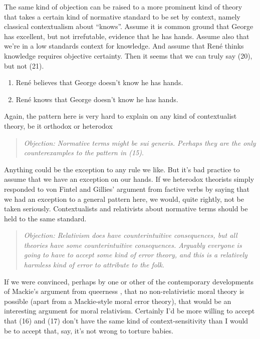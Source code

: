 The same kind of objection can be raised to a more prominent kind of theory that takes a certain kind of normative standard to be set by context, namely classical contextualism about ``knows''. Assume it is common ground that George has excellent, but not irrefutable, evidence that he has hands. Assume also that we're in a low standards context for knowledge. And assume that René thinks knowledge requires objective certainty. Then it seems that we can truly say (20), but not (21).

\begin{enumerate}
\renewcommand{\labelenumi}{(\arabic{enumi})}
\setcounter{enumi}{19}
\item René believes that George doesn't know he has hands.
\item René knows that George doesn't know he has hands.
\end{enumerate}

\noindent Again, the pattern here is very hard to explain on any kind of contextualist theory, be it orthodox or heterodox

\begin{quote}
\textit{Objection: Normative terms might be sui generis. Perhaps they are the only counterexamples to the pattern in (15)}.
\end{quote}

\noindent Anything could be the exception to any rule we like. But it's bad practice to assume that we have an exception on our hands. If we heterodox theorists simply responded to von Fintel and Gillies' argument from factive verbs by saying that we had an exception to a general pattern here, we would, quite rightly, not be taken seriously. Contextualists and relativists about normative terms should be held to the same standard.

\begin{quote}
\textit{Objection: Relativism does have counterintuitive consequences, but all theories have some counterintuitive consequences. Arguably everyone is going to have to accept some kind of error theory, and this is a relatively harmless kind of error to attribute to the folk}.
\end{quote}

\noindent If we were convinced, perhaps by one or other of the contemporary developments of Mack\-ie's argument from queerness \citep{Mackie1977}, that no non-relativistic moral theory is possible (apart from a Mackie-style moral error theory), that would be an interesting argument for moral relativism. Certainly I'd be more willing to accept that (16) and (17) don't have the same kind of context-sensitivity than I would be to accept that, say, it's not wrong to torture babies.

